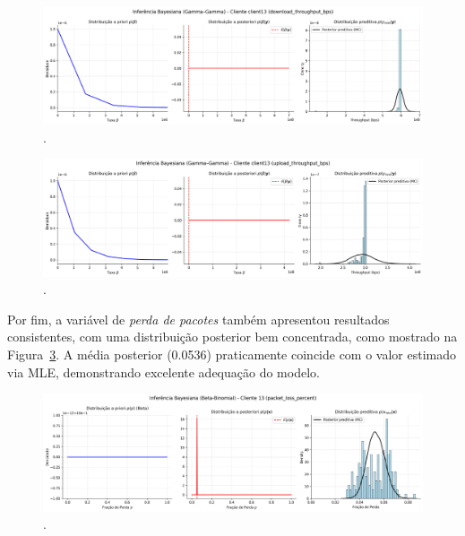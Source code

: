 \documentclass{article}
\begin{document}
\begin{figure}[htp]
	\centering
	\includegraphics[width=\textwidth]{../figures/bayes/download_throughput_bps_bayesian_gammagamma_client13.png}
	\caption{.}
	\label{fig:download_throughput_bps_bayesian_gammagamma_client13}
\end{figure}
\begin{figure}[htp]
	\centering
	\includegraphics[width=\textwidth]{../figures/bayes/upload_throughput_bps_bayesian_gammagamma_client13.png}
	\caption{.}
	\label{fig:upload_throughput_bps_bayesian_gammagamma_client13}
\end{figure}

Por fim, a variável de \textit{perda de pacotes} também apresentou resultados consistentes,
com uma distribuição posterior bem concentrada, como mostrado na
Figura~\ref{fig:packet_loss_percent_bayesian_betabinomial_client13}.
A média posterior (0.0536) praticamente coincide com o valor estimado via MLE, demonstrando
excelente adequação do modelo.

\begin{figure}[htp]
	\centering
	\includegraphics[width=\textwidth]{../figures/bayes/packet_loss_percent_bayesian_betabinomial_client13.png}
	\caption{.}
	\label{fig:packet_loss_percent_bayesian_betabinomial_client13}
\end{figure}
\end{document}
